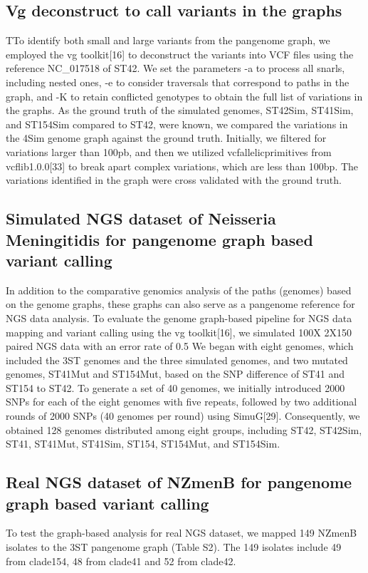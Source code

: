 \subsection{Vg deconstruct to call variants in the graphs}
TTo identify both small and large variants from the pangenome graph, we employed the vg toolkit[16] to deconstruct the variants into VCF files using the reference NC_017518 of ST42. We set the parameters -a to process all snarls, including nested ones, -e to consider traversals that correspond to paths in the graph, and -K to retain conflicted genotypes to obtain the full list of variations in the graphs.
As the ground truth of the simulated genomes, ST42Sim, ST41Sim, and ST154Sim compared to ST42, were known, we compared the variations in the 4Sim genome graph against the ground truth. Initially, we filtered for variations larger than 100pb, and then we utilized vcfallelicprimitives from vcflib1.0.0[33] to break apart complex variations, which are less than 100bp. The variations identified in the graph were cross validated with the ground truth.
\subsection{Simulated NGS dataset of Neisseria Meningitidis for pangenome graph based variant calling}
In addition to the comparative genomics analysis of the paths (genomes) based on the genome graphs, these graphs can also serve as a pangenome reference for NGS data analysis. To evaluate the genome graph-based pipeline for NGS data mapping and variant calling using the vg toolkit[16], we simulated 100X 2X150 paired NGS data with an error rate of 0.5%
We began with eight genomes, which included the 3ST genomes and the three simulated genomes, and two mutated genomes, ST41Mut and ST154Mut, based on the SNP difference of ST41 and ST154 to ST42. To generate a set of 40 genomes, we initially introduced 2000 SNPs for each of the eight genomes with five repeats, followed by two additional rounds of 2000 SNPs (40 genomes per round) using SimuG[29]. Consequently, we obtained 128 genomes distributed among eight groups, including ST42, ST42Sim, ST41, ST41Mut, ST41Sim, ST154, ST154Mut, and ST154Sim.
\subsection{Real NGS dataset of NZmenB for pangenome graph based variant calling}
To test the graph-based analysis for real NGS dataset, we mapped 149 NZmenB isolates to the 3ST pangenome graph (Table S2). The 149 isolates include 49 from clade154, 48 from clade41 and 52 from clade42.
